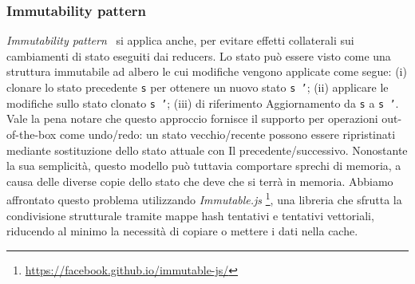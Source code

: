 \subsubsection*{Immutability pattern}

\emph{Immutability pattern}~\cite{immutability} si applica anche, per evitare effetti collaterali sui cambiamenti di stato
eseguiti dai reducers.
Lo stato può essere visto come una struttura immutabile ad albero le cui modifiche vengono applicate come segue:
(i) clonare lo stato precedente \texttt{s} per ottenere un nuovo stato \texttt{s '};
(ii) applicare le modifiche sullo stato clonato \texttt{s '};
(iii) di riferimento Aggiornamento da \texttt{s} a \texttt{s '}. Vale la pena notare che questo approccio fornisce
il supporto per operazioni out-of-the-box come undo/redo: un stato vecchio/recente possono essere ripristinati mediante sostituzione
dello stato attuale con Il precedente/successivo.
Nonostante la sua semplicità, questo modello può tuttavia comportare sprechi di memoria, a causa delle diverse copie dello
stato che deve che si terrà in memoria. Abbiamo affrontato questo problema utilizzando \emph{Immutable.js}
\footnote{\url{https://facebook.github.io/immutable-js/}}, una libreria che sfrutta la condivisione strutturale tramite
mappe hash tentativi e tentativi vettoriali, riducendo al minimo la necessità di copiare o mettere i dati nella cache.

